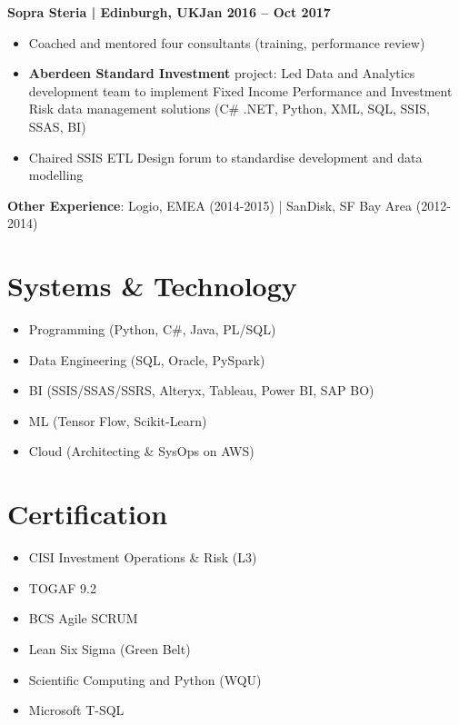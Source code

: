 \documentclass[10pt]{article} %
\newcommand{\roleHeading}[2]{\textbf{#1}\hfill\textbf{#2}}
\newcommand{\resumeItemListStart}{
    \begin{itemize}[
        noitemsep,
        leftmargin=3.5mm,
        rightmargin=0mm,
        topsep=2pt,
        label=\textbullet
        ]
    }
\newcommand{\resumeItemListEnd}{\end{itemize}\vspace{-5pt}}
\begin{document}
\begin{paracol}{2}
    \roleHeading{Sopra Steria | Edinburgh, UK}{Jan 2016 -- Oct 2017}
    \resumeItemListStart
        \item Coached and mentored four consultants (training, performance review)
        \item \textbf{Aberdeen Standard Investment} project: Led Data and Analytics development team to implement Fixed Income Performance and Investment Risk data management solutions (C\# .NET, Python, XML, SQL, SSIS, SSAS, BI)
        \item Chaired SSIS ETL Design forum to standardise development and data modelling
    \resumeItemListEnd

    \smallskip
    \par\noindent\dotfill
    \smallskip
    
    \raggedright\textbf{Other Experience}: Logio, EMEA (2014-2015) | SanDisk, SF Bay Area (2012-2014)


\switchcolumn


\section{Systems \& Technology}
\resumeItemListStart
  \item Programming (Python, C\#, Java, PL/SQL)
  \item Data Engineering (SQL, Oracle, PySpark)
  \item BI (SSIS/SSAS/SSRS, Alteryx, Tableau, Power BI, SAP BO)
  \item ML (Tensor Flow, Scikit-Learn)
  \item Cloud (Architecting \& SysOps on AWS)
\resumeItemListEnd

\section{Certification}
\resumeItemListStart
    \item CISI Investment Operations \& Risk (L3)
    \item TOGAF 9.2
    \item BCS Agile SCRUM
    \item Lean Six Sigma (Green Belt)
    \item Scientific Computing and Python (WQU)
    \item Microsoft T-SQL
\resumeItemListEnd


\end{paracol}
\end{document}
